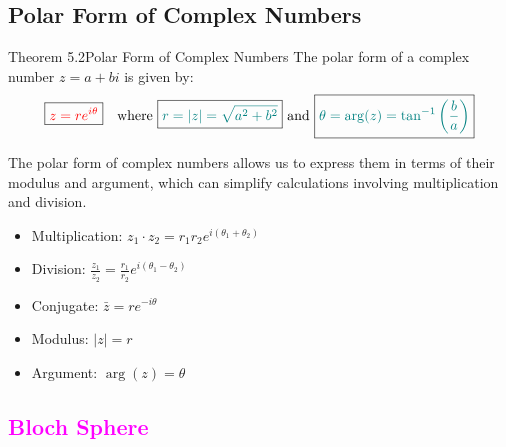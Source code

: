 \documentclass{book}
\begin{document}
\subsection{Polar Form of Complex Numbers}
\begin{thmBox}{Theorem 5.2}{Polar Form of Complex Numbers}
    The polar form of a complex number $z = a + bi$ is given by:
    \[
        \boxed{\textcolor{red}{z = re^{i\theta}}} \quad \text{where } \boxed{\textcolor{teal}{r = |z| = \sqrt{a^2 + b^2}}} \text{ and } \boxed{\textcolor{teal}{\theta = \arg(z) = \tan^{-1}\left(\frac{b}{a}\right)}}
    \]
    \begin{center}
    \end{center}
\end{thmBox}
The polar form of complex numbers allows us to express them in terms of their modulus and argument, which can simplify calculations involving multiplication and division.\\
\begin{itemize}
    \item Multiplication: $z_1 \cdot z_2 = r_1r_2 e^{i(\theta_1 + \theta_2)}$
    \item Division: $\frac{z_1}{z_2} = \frac{r_1}{r_2} e^{i(\theta_1 - \theta_2)}$
    \item Conjugate: $\bar{z} = re^{-i\theta}$
    \item Modulus: $|z| = r$
    \item Argument: $\arg(z) = \theta$
\end{itemize}
\textcolor{magenta}{\section{\textbf{Bloch Sphere}}}
\end{document}
